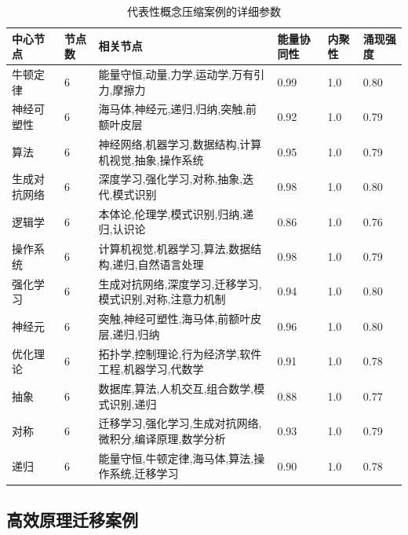 \documentclass[12pt,a4paper]{article}
\begin{document}
\begin{table}[H]
\centering
\caption{代表性概念压缩案例的详细参数}
\label{tab:compression_cases_detailed}
\begin{tabular}{p{2.5cm}p{1.5cm}p{3cm}p{1.5cm}p{1.5cm}p{1.5cm}}
\toprule
\textbf{中心节点} & \textbf{节点数} & \textbf{相关节点} & \textbf{能量协同性} & \textbf{内聚性} & \textbf{涌现强度} \\
\midrule
牛顿定律 & 6 & 能量守恒,动量,力学,运动学,万有引力,摩擦力 & 0.99 & 1.0 & 0.80 \\
神经可塑性 & 6 & 海马体,神经元,递归,归纳,突触,前额叶皮层 & 0.92 & 1.0 & 0.79 \\
算法 & 6 & 神经网络,机器学习,数据结构,计算机视觉,抽象,操作系统 & 0.95 & 1.0 & 0.79 \\
生成对抗网络 & 6 & 深度学习,强化学习,对称,抽象,迭代,模式识别 & 0.98 & 1.0 & 0.80 \\
逻辑学 & 6 & 本体论,伦理学,模式识别,归纳,递归,认识论 & 0.86 & 1.0 & 0.76 \\
操作系统 & 6 & 计算机视觉,机器学习,算法,数据结构,递归,自然语言处理 & 0.98 & 1.0 & 0.79 \\
强化学习 & 6 & 生成对抗网络,深度学习,迁移学习,模式识别,对称,注意力机制 & 0.94 & 1.0 & 0.80 \\
神经元 & 6 & 突触,神经可塑性,海马体,前额叶皮层,递归,归纳 & 0.96 & 1.0 & 0.80 \\
优化理论 & 6 & 拓扑学,控制理论,行为经济学,软件工程,机器学习,代数学 & 0.91 & 1.0 & 0.78 \\
抽象 & 6 & 数据库,算法,人机交互,组合数学,模式识别,递归 & 0.88 & 1.0 & 0.77 \\
对称 & 6 & 迁移学习,强化学习,生成对抗网络,微积分,编译原理,数学分析 & 0.93 & 1.0 & 0.79 \\
递归 & 6 & 能量守恒,牛顿定律,海马体,算法,操作系统,迁移学习 & 0.90 & 1.0 & 0.78 \\
\bottomrule
\end{tabular}
\end{table}

\subsection{高效原理迁移案例}
\end{document}

